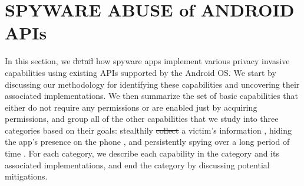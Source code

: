 \documentclass[sigconf,balance=false]{acmart}
\newcommand{\geoff}[1]{\textcolor{purple}{\noindent[GV: #1]}}
\newcommand{\geoff}[1]{}
\providecommand{\DIFadd}[1]{{\protect\color{blue}\uwave{#1}}} %
\providecommand{\DIFdel}[1]{{\protect\color{red}\sout{#1}}}                      %
\providecommand{\DIFaddbegin}{} %
\providecommand{\DIFaddend}{} %
\providecommand{\DIFdelbegin}{} %
\providecommand{\DIFdelend}{} %
\newcommand{\DIFscaledelfig}{0.5}
\newlength{\DIFdelgraphicswidth} %
\newlength{\DIFdelgraphicsheight} %
\newcommand{\DIFaddincludegraphics}[2][]{{\color{blue}\fbox{\DIFOincludegraphics[#1]{#2}}}} %
\newcommand{\DIFdelincludegraphics}[2][]{%
\sbox{\DIFdelgraphicsbox}{\DIFOincludegraphics[#1]{#2}}%
\settoboxwidth{\DIFdelgraphicswidth}{\DIFdelgraphicsbox} %
\settoboxtotalheight{\DIFdelgraphicsheight}{\DIFdelgraphicsbox} %
\scalebox{\DIFscaledelfig}{%
\parbox[b]{\DIFdelgraphicswidth}{\usebox{\DIFdelgraphicsbox}\\[-\baselineskip] \rule{\DIFdelgraphicswidth}{0em}}\llap{\resizebox{\DIFdelgraphicswidth}{\DIFdelgraphicsheight}{%
\setlength{\unitlength}{\DIFdelgraphicswidth}%
\begin{picture}(1,1)%
\thicklines\linethickness{2pt} %
{\color[rgb]{1,0,0}\put(0,0){\framebox(1,1){}}}%
{\color[rgb]{1,0,0}\put(0,0){\line( 1,1){1}}}%
{\color[rgb]{1,0,0}\put(0,1){\line(1,-1){1}}}%
\end{picture}%
}\hspace*{3pt}}} %
} %
\DeclareRobustCommand{\DIFaddbegin}{\DIFOaddbegin \let\includegraphics\DIFaddincludegraphics} %
\DeclareRobustCommand{\DIFaddend}{\DIFOaddend \let\includegraphics\DIFOincludegraphics} %
\DeclareRobustCommand{\DIFdelbegin}{\DIFOdelbegin \let\includegraphics\DIFdelincludegraphics} %
\DeclareRobustCommand{\DIFdelend}{\DIFOaddend \let\includegraphics\DIFOincludegraphics} %
\begin{document}
\DIFdelbegin %


\DIFdelend %

%

\section{SPYWARE ABUSE of ANDROID APIs}
\label{sec:api-abuse}

In this section, we \DIFdelbegin \DIFdel{detail }\DIFdelend \DIFaddbegin \DIFadd{explain }\DIFaddend how spyware apps implement various privacy invasive
capabilities using existing APIs supported by the Android OS.
We start by discussing our methodology for identifying these capabilities and uncovering their associated implementations.
We then summarize the set of basic capabilities \DIFaddbegin \DIFadd{(\S~\ref{subsec:features_enabled_by_permission}) }\DIFaddend that either do not require any permissions or are enabled just by acquiring permissions,
and group
all of the other capabilities that we study into three categories based on their goals: stealthily
\DIFdelbegin \DIFdel{collect }\DIFdelend \DIFaddbegin \DIFadd{collecting }\DIFaddend a victim's information \DIFaddbegin \DIFadd{(\S~\ref{subsec:data_gathering})}\DIFaddend , hiding the app's presence on the phone \DIFaddbegin \DIFadd{(\S~\ref{subsec:hiding_the_app})}\DIFaddend , and persistently
spying over a long period of time \DIFaddbegin \DIFadd{(\S~\ref{subsec:persistence})}\DIFaddend .
For each category, we
describe
each capability in the category and its associated implementations, and end
the category by discussing potential mitigations.
\end{document}
